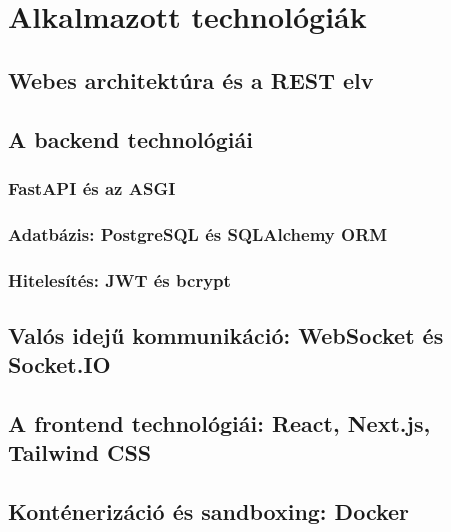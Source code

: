 \chapter{Alkalmazott technológiák}
\label{ch:technologiak}

\section{Webes architektúra és a REST elv}

\section{A backend technológiái}
\subsection{FastAPI és az ASGI}

\subsection{Adatbázis: PostgreSQL és SQLAlchemy ORM}

\subsection{Hitelesítés: JWT és bcrypt}

\section{Valós idejű kommunikáció: WebSocket és Socket.IO}

\section{A frontend technológiái: React, Next.js, Tailwind CSS}

\section{Konténerizáció és sandboxing: Docker}
